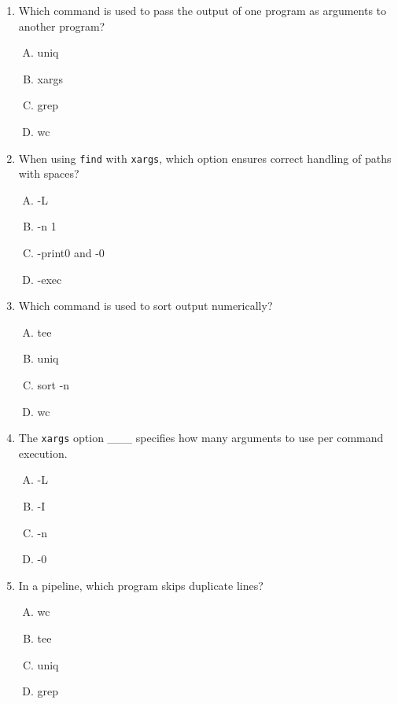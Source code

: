 \documentclass[a4paper]{report}
\begin{document}
\begin{enumerate}[1.]
    \item Which command is used to pass the output of one program as arguments to another program?  
    \begin{enumerate}[A)]
        \item uniq  
        \item xargs  
        \item grep  
        \item wc  
    \end{enumerate}

    \item When using \texttt{find} with \texttt{xargs}, which option ensures correct handling of paths with spaces?  
    \begin{enumerate}[A)]
        \item -L  
        \item -n 1  
        \item -print0 and -0  
        \item -exec  
    \end{enumerate}

    \item Which command is used to sort output numerically?  
    \begin{enumerate}[A)]
        \item tee  
        \item uniq  
        \item sort -n  
        \item wc  
    \end{enumerate}

    \item The \texttt{xargs} option \_\_\_ specifies how many arguments to use per command execution.  
    \begin{enumerate}[A)]
        \item -L  
        \item -I  
        \item -n  
        \item -0  
    \end{enumerate}

    \item In a pipeline, which program skips duplicate lines?  
    \begin{enumerate}[A)]
        \item wc  
        \item tee  
        \item uniq  
        \item grep  
    \end{enumerate}


\end{enumerate}
\end{document}
